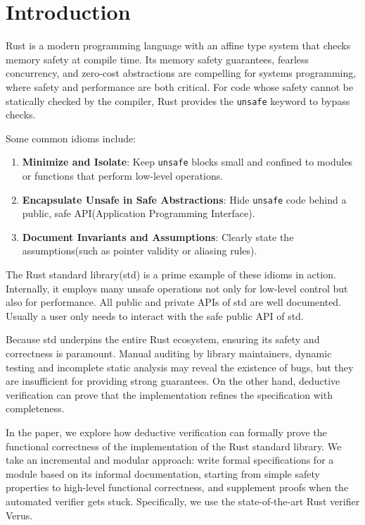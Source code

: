 \documentclass[conference]{IEEEtran}
\begin{document}
\section{Introduction}
Rust\cite{matsakis2014rust} is a modern programming language with an affine type system that checks memory safety at compile time. Its memory safety guarantees, fearless concurrency, and zero-cost abstractions are compelling for systems programming, where safety and performance are both critical. For code whose safety cannot be statically checked by the compiler, Rust provides the \texttt{unsafe} keyword to bypass checks. 


Some common idioms include:
\begin{enumerate}
    \item \textbf{Minimize and Isolate}: Keep \texttt{unsafe} blocks small and confined to modules or functions that perform low-level operations. 
    \item \textbf{Encapsulate Unsafe in Safe Abstractions}: Hide \texttt{unsafe} code behind a public, safe API(Application Programming Interface). 
    \item \textbf{Document Invariants and Assumptions}: Clearly state the assumptions(such as pointer validity or aliasing rules). 
\end{enumerate}


The Rust standard library(std) is a prime example of these idioms in action. Internally, it employs many unsafe operations not only for low-level control but also for performance. All public and private APIs of std are well documented. Usually a user only needs to interact with the safe public API of std.  


Because std underpins the entire Rust ecosystem, ensuring its safety and correctness is paramount. Manual auditing by library maintainers, dynamic testing and incomplete static analysis may reveal the existence of bugs, but they are insufficient for providing strong guarantees. On the other hand, deductive verification can prove that the implementation refines the specification with completeness.           


In the paper, we explore how deductive verification can formally prove the functional correctness of the implementation of the Rust standard library. We take an incremental and modular approach: write formal specifications for a module based on its informal documentation, starting from simple safety properties to high-level functional correctness, and supplement proofs when the automated verifier gets stuck. Specifically, we use the state-of-the-art Rust verifier Verus\cite{verus}. 
\end{document}

